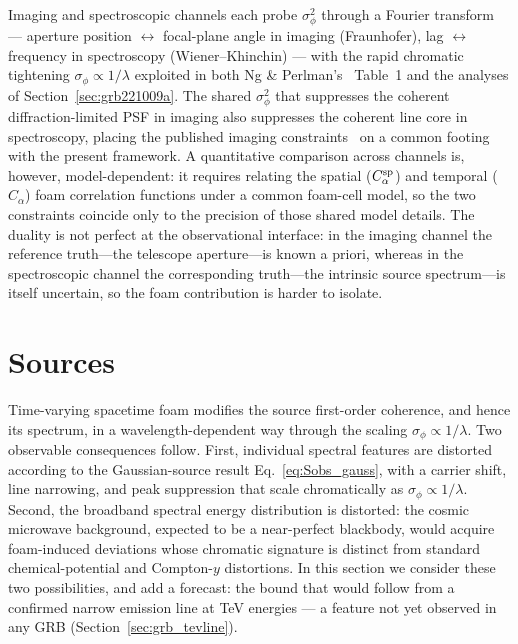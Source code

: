 \documentclass[aps,prd,onecolumn,amsmath,amssymb]{revtex4-2}
\begin{document}
Imaging and spectroscopic channels each probe $\sigma_\phi^2$ through
a Fourier transform --- aperture position $\leftrightarrow$ focal-plane
angle in imaging (Fraunhofer), lag $\leftrightarrow$ frequency in
spectroscopy (Wiener--Khinchin) --- with the rapid chromatic tightening
$\sigma_\phi\propto 1/\lambda$ exploited in both Ng \&
Perlman's~\cite{NgPerlman2022} Table~1 and the analyses of
Section~\ref{sec:grb221009a}.  The shared $\sigma_\phi^2$ that
suppresses the coherent diffraction-limited PSF in imaging also
suppresses the coherent line core in spectroscopy, placing the
published imaging
constraints~\cite{NgPerlman2022,LieuHillman2003,Christiansen2011,Perlman2015}
on a common footing with the present framework.  A quantitative
comparison across channels is, however, model-dependent: it requires
relating the spatial ($C_\alpha^{\rm sp}$) and temporal ($C_\alpha$)
foam correlation functions under a common foam-cell model, so the two
constraints coincide only to the precision of those shared model
details.  The duality is not
perfect at the observational interface: in the imaging channel the
reference truth---the telescope aperture---is known a priori, whereas in
the spectroscopic channel the corresponding truth---the intrinsic source
spectrum---is itself uncertain, so the foam contribution is harder to
isolate.

\section{Sources}
\label{sec:sources}

Time-varying spacetime foam modifies the source first-order coherence,
and hence its spectrum, in a wavelength-dependent way through
the scaling $\sigma_\phi \propto 1/\lambda$. Two observable
consequences follow. First, individual spectral features are distorted according to the
Gaussian-source result Eq.~\eqref{eq:Sobs_gauss}, with a carrier shift,
line narrowing, and peak suppression that scale chromatically as
$\sigma_\phi\propto1/\lambda$. Second, the
broadband spectral energy distribution is distorted: the cosmic
microwave background, expected to be a near-perfect blackbody, would
acquire foam-induced deviations whose chromatic signature is distinct
from standard chemical-potential and Compton-$y$ distortions.
In this section we consider these two possibilities, and add a
forecast: the bound that would follow from a confirmed narrow
emission line at TeV energies --- a feature not yet observed in any
GRB (Section~\ref{sec:grb_tevline}).
\end{document}
